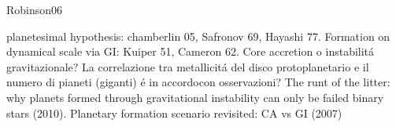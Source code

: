 
\begin{workout}
	Robinson06
\end{workout}

\begin{workout}[Refs GI vs CA]
	planetesimal hypothesis: chamberlin 05, Safronov 69, Hayashi 77. Formation on dynamical scale via GI: Kuiper 51, Cameron 62.
	Core accretion o instabilit\'a gravitazionale?
	La correlazione tra metallicit\'a del disco protoplanetario e il numero di pianeti (giganti) \'e in accordocon osservazioni?
	The runt of the litter: why planets formed through gravitational instability can only be failed binary stars (2010).
	Planetary formation scenario revisited: CA vs GI (2007)
\end{workout}


